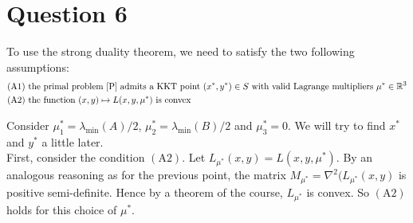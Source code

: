 \documentclass{article}
\newcommand{\R}{\mathbb{R}}
\begin{document}
\section*{Question 6}
To use the strong duality theorem, we need to satisfy the two following assumptions:
\begin{align*}
(\text{A}1) &  \text{ the primal problem \eqref{P} admits a KKT point } (x^*,y^*)\in S \text{ with valid Lagrange multipliers } \mu^*\in \R^3 \\
(\text{A}2) &  \text{ the function } (x,y)\mapsto L(x,y,\mu^*) \text{ is convex}
\end{align*}

Consider $\mu_1^*=\lambda_{\min} (A)/2$, $\mu_2^*=\lambda_{\min} (B)/2$ and $\mu_3^*=0$. We will try to find $x^*$ and $y^*$ a little later.\\

\noindent First, consider the condition $(\text{A}2)$. Let $L_{\mu^*}(x,y) = L(x,y,\mu^*)$. By an analogous reasoning as for the previous point, the matrix $M_{\mu^*}=\nabla^2(L_{\mu^*}(x,y)$ is positive semi-definite. Hence by a theorem of the course, $L_{\mu^*}$ is convex. So $(\text{A}2)$ holds for this choice of $\mu^*$.\\
\end{document}
